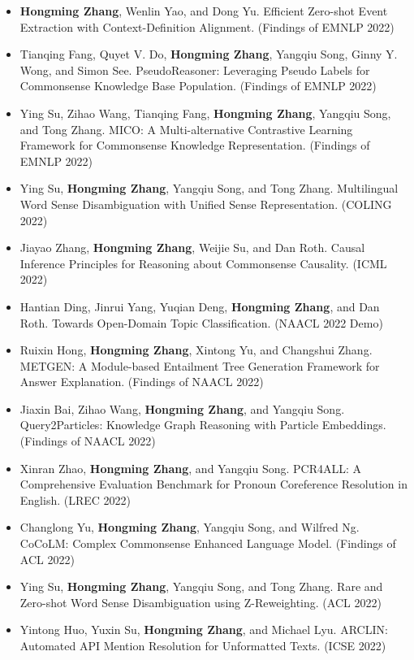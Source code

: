 \begin{itemize}[leftmargin=*, itemsep=0.35em, topsep=0.2em]
\begin{itemize}[leftmargin=1.5em, itemsep=0.2em, topsep=0.1em]
    \item \textbf{Hongming Zhang}, Wenlin Yao, and Dong Yu. Efficient Zero-shot Event Extraction with Context-Definition Alignment. (Findings of EMNLP 2022)
    \item Tianqing Fang, Quyet V. Do, \textbf{Hongming Zhang}, Yangqiu Song, Ginny Y. Wong, and Simon See. PseudoReasoner: Leveraging Pseudo Labels for Commonsense Knowledge Base Population. (Findings of EMNLP 2022)
    \item Ying Su, Zihao Wang, Tianqing Fang, \textbf{Hongming Zhang}, Yangqiu Song, and Tong Zhang. MICO: A Multi-alternative Contrastive Learning Framework for Commonsense Knowledge Representation. (Findings of EMNLP 2022)
    \item Ying Su, \textbf{Hongming Zhang}, Yangqiu Song, and Tong Zhang. Multilingual Word Sense Disambiguation with Unified Sense Representation. (COLING 2022)
    \item Jiayao Zhang, \textbf{Hongming Zhang}, Weijie Su, and Dan Roth. Causal Inference Principles for Reasoning about Commonsense Causality. (ICML 2022)
    \item Hantian Ding, Jinrui Yang, Yuqian Deng, \textbf{Hongming Zhang}, and Dan Roth. Towards Open-Domain Topic Classification. (NAACL 2022 Demo)
    \item Ruixin Hong, \textbf{Hongming Zhang}, Xintong Yu, and Changshui Zhang. METGEN: A Module-based Entailment Tree Generation Framework for Answer Explanation. (Findings of NAACL 2022)
    \item Jiaxin Bai, Zihao Wang, \textbf{Hongming Zhang}, and Yangqiu Song. Query2Particles: Knowledge Graph Reasoning with Particle Embeddings. (Findings of NAACL 2022)
    \item Xinran Zhao, \textbf{Hongming Zhang}, and Yangqiu Song. PCR4ALL: A Comprehensive Evaluation Benchmark for Pronoun Coreference Resolution in English. (LREC 2022)
    \item Changlong Yu, \textbf{Hongming Zhang}, Yangqiu Song, and Wilfred Ng. CoCoLM: Complex Commonsense Enhanced Language Model. (Findings of ACL 2022)
    \item Ying Su, \textbf{Hongming Zhang}, Yangqiu Song, and Tong Zhang. Rare and Zero-shot Word Sense Disambiguation using Z-Reweighting. (ACL 2022)
    \item Yintong Huo, Yuxin Su, \textbf{Hongming Zhang}, and Michael Lyu. ARCLIN: Automated API Mention Resolution for Unformatted Texts. (ICSE 2022)
  \end{itemize}


\end{itemize}

